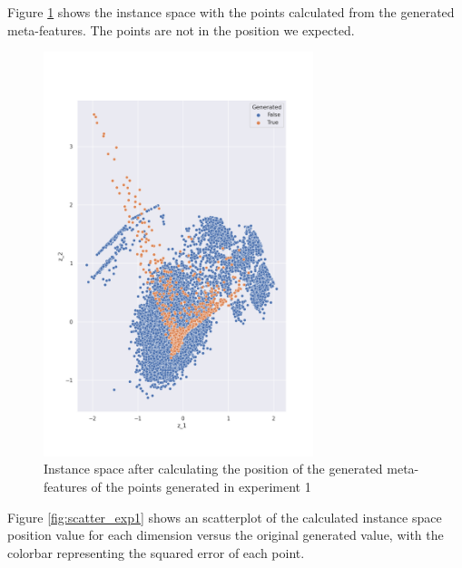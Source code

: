Figure \ref{fig:is_exp1} shows the instance space with the points calculated from the generated meta-features. The points are not in the position we expected.

\begin{figure}[H]
    \centering
    \includegraphics[width=0.7\textwidth]{Cap5/all_coords1}
    \caption{Instance space after calculating the position of the generated meta-features of the points generated in experiment 1}
    \label{fig:is_exp1}
\end{figure}

Figure \ref{fig:scatter_exp1} shows an scatterplot of the calculated instance space position value for each dimension versus the original generated value, with the colorbar representing the squared error of each point.

